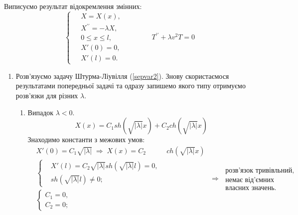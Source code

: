 Виписуємо результат відокремлення змінних:
\begin{equation} \label{sepvar2}
    \left\{ \begin{aligned}
        \;&X = X(x), \\
          &X^{\prime\prime} = -\lambda X, \\
          &0 \leq x \leq l, \\
          &X'(0) = 0, \\ 
          &X'(l) = 0. 
    \end{aligned} \right.
    \qquad\qquad
    T^{\prime\prime} + \lambda v^2 T = 0
\end{equation}

\begin{enumerate}
    \item[] Розв'язуємо задачу Штурма-Ліувілля (\ref{sepvar2}). Знову скористаємося результатами попередньої задачі та одразу запишемо якого типу отримуємо розв'язки для різних $\lambda$.
    \begin{enumerate}[wide, labelindent=0pt]
        
        \item Випадок $\lambda < 0$. 
        \begin{equation*}
            X(x) = C_1 sh(\sqrt{|\lambda|}x) + C_2 ch({\sqrt{|\lambda|}x})
        \end{equation*}
        Знаходимо константи з межових умов:
        \begin{equation*}
            \begin{aligned}
                &X'(0) = C_1\sqrt{|\lambda|}
                \;\Rightarrow\;
                X(x) = C_2 &ch(\sqrt{|\lambda|}x)\\
                &\left\{ \begin{aligned}
                    &X'(l) = C_2\sqrt{|\lambda|} sh(\sqrt{|\lambda|}l) = 0, \\
                    &sh(\sqrt{|\lambda|}l) \neq 0;
                \end{aligned} \right.&\\
                &\left\{ \begin{aligned}
                    C_1 = 0, \\ 
                    C_2 = 0;
                \end{aligned} \right. \qquad\qquad\qquad\qquad&
            \end{aligned}
            \;\Rightarrow\;
            \begin{aligned}
                \text{розв'язок тривівльний,}\\
                \text{немає від'ємних}\\
                \text{власних значень.}
            \end{aligned}
        \end{equation*}


\end{enumerate}
\end{enumerate}
